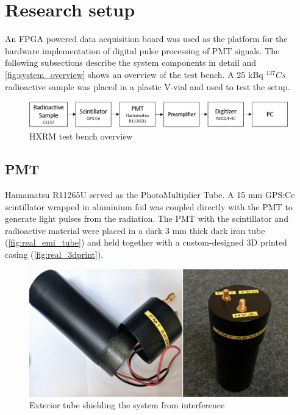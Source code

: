 \section{Research setup}

An FPGA powered data acquisition board was used as the platform 
for the hardware implementation of digital pulse processing of PMT
signals.
The following subsections describe the system components in detail and
\autoref{fig:system_overview} shows an overview of the test bench.
A 25 kBq $^{137} Cs$ radioactive sample was placed in a plastic V-vial
and used to test the setup.

\begin{figure}[H]
  \centering
  \includegraphics[width=\linewidth]{media/system_overview.png}
  \caption{HXRM test bench overview}
  \label{fig:system_overview} 
\end{figure}

\subsection{PMT}

Hamamatsu R11265U served as the PhotoMultiplier Tube. 
A 15 mm GPS:Ce scintillator wrapped in aluminium foil was 
coupled directly with the PMT to generate light pulses
from the radiation. The PMT with the scintillator and radioactive material
were placed in a dark 3 mm thick dark iron tube (\autoref{fig:real_emi_tube})
and held together with a custom-designed 3D printed casing (\autoref{fig:real_3dprint}).


\begin{figure}[H]
  \centering
  \includegraphics[width=0.75\linewidth]{media/real_emi_tube.png}
  \caption{Exterior tube shielding the system from interference}
  \label{fig:real_emi_tube} 
\end{figure}

